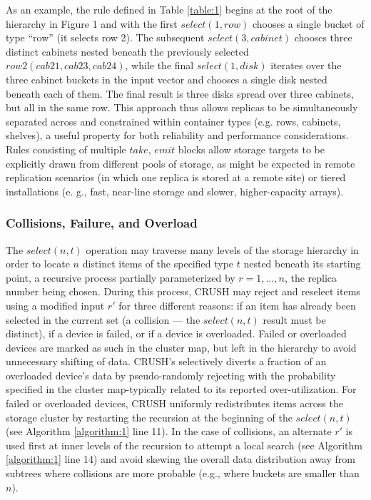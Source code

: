 \documentclass[12pt,a4paper]{report}
\begin{document}
As an example, the rule defined in Table \ref{table:1} begins at the root of the hierarchy
in Figure 1 and with the first $select(1,row)$ chooses a single bucket of type
``row'' (it selects row 2). The subsequent $select(3,cabinet)$ chooses three
distinct cabinets nested  beneath the previously selected $row2 (cab21, cab23,
cab24)$, while the final $select(1,disk)$ iterates over the three cabinet
buckets in the input vector and chooses a single disk nested beneath each of
them. The final result is three disks spread over three cabinets, but all in
the same row. This approach thus allows replicas to be simultaneously separated
across and constrained within container types (e.g. rows, cabinets, shelves), a
useful property for both reliability and performance considerations. Rules
consisting of multiple $take$, $emit$ blocks allow storage targets to be
explicitly drawn from different pools of storage, as might be expected in
remote replication scenarios (in which one replica is stored at a remote site)
or tiered installations (e. g., fast, near-line storage and slower,
higher-capacity arrays).

\subsubsection{Collisions, Failure, and Overload}
The $select(n,t)$ operation may traverse many levels of the storage hierarchy
in order to locate $n$ distinct items of the specified type $t$ nested beneath
its starting point, a recursive process partially parameterized by $r =
1,\dots,n$, the replica number being chosen. During this process, CRUSH may
reject and reselect items using a modified input $r'$ for three different
reasons: if an item has already been selected in the current set (a collision
--- the $select(n,t)$ result must be distinct), if a device is failed, or if a
device is overloaded. Failed or overloaded devices are marked as such in the
cluster map, but left in the hierarchy to avoid unnecessary shifting of data.
CRUSH’s selectively diverts a fraction of an overloaded device’s data by
pseudo-randomly rejecting with the probability specified in the cluster
map-typically related to its reported over-utilization. For failed or
overloaded devices, CRUSH uniformly redistributes items across the storage
cluster by restarting the recursion at the beginning of the $select(n, t)$ (see
Algorithm \ref{algorithm:1} line 11). In the case of collisions, an alternate
$r'$ is used first at inner levels of the recursion to attempt a local search
(see Algorithm \ref{algorithm:1} line 14) and avoid skewing the overall data
distribution away from subtrees where collisions are more probable (e.g., where
buckets are smaller than $n$).
\end{document}
